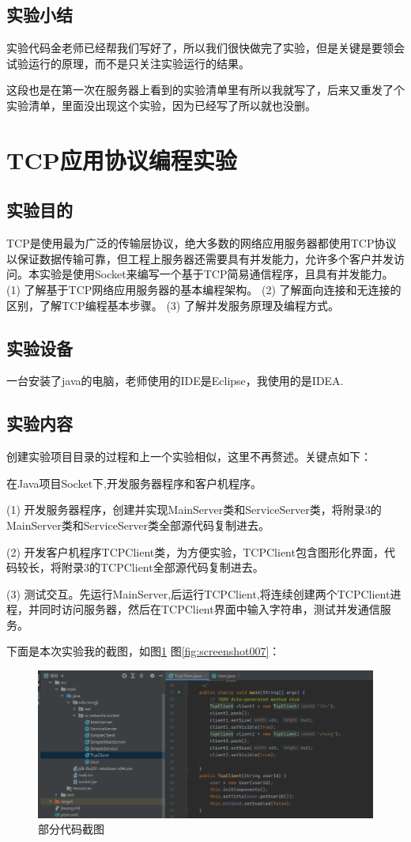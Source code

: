 \documentclass[lang=cn,11pt,a4paper,cite=authoryear]{elegantpaper}
\begin{document}
\subsection{实验小结}
实验代码金老师已经帮我们写好了，所以我们很快做完了实验，但是关键是要领会试验运行的原理，而不是只关注实验运行的结果。

这段也是在第一次在服务器上看到的实验清单里有所以我就写了，后来又重发了个实验清单，里面没出现这个实验，因为已经写了所以就也没删。

\section{TCP应用协议编程实验}
\subsection{实验目的}
TCP是使用最为广泛的传输层协议，绝大多数的网络应用服务器都使用TCP协议以保证数据传输可靠，但工程上服务器还需要具有并发能力，允许多个客户并发访问。本实验是使用Socket来编写一个基于TCP简易通信程序，且具有并发能力。
(1)	了解基于TCP网络应用服务器的基本编程架构。
(2)	了解面向连接和无连接的区别，了解TCP编程基本步骤。
(3)	了解并发服务原理及编程方式。

\subsection{实验设备}
一台安装了java的电脑，老师使用的IDE是Eclipse，我使用的是IDEA.

\subsection{实验内容}
创建实验项目目录的过程和上一个实验相似，这里不再赘述。关键点如下：

在Java项目Socket下,开发服务器程序和客户机程序。

(1)	开发服务器程序，创建并实现MainServer类和ServiceServer类，将附录3的MainServer类和ServiceServer类全部源代码复制进去。

(2)	开发客户机程序TCPClient类，为方便实验，TCPClient包含图形化界面，代码较长，将附录3的TCPClient全部源代码复制进去。

(3)	测试交互。先运行MainServer,后运行TCPClient,将连续创建两个TCPClient进程，并同时访问服务器，然后在TCPClient界面中输入字符串，测试并发通信服务。

下面是本次实验我的截图，如图\ref{fig:screenshot008} 图\ref{fig:screenshot007}：

\begin{figure}[htbp]
	\centering
	\includegraphics[width=0.8\linewidth]{image/screenshot008}
	\caption{部分代码截图}
	\label{fig:screenshot008}
\end{figure}
\end{document}
